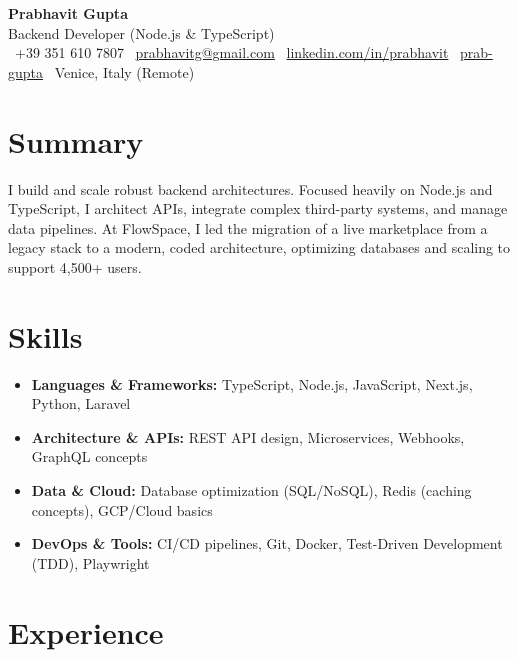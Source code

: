 \documentclass[a4paper,10pt]{article}
\begin{document}
\begin{center}
 {\Huge\bfseries Prabhavit Gupta}\\[3pt]
 {\color{accent}\large Backend Developer (Node.js \& TypeScript)}\\[5pt]
 \faPhone\ +39 351 610 7807 \quad
 \faEnvelope\ \href{mailto:prabhavitg@gmail.com}{prabhavitg@gmail.com} \quad
 \faLinkedin\ \href{https://www.linkedin.com/in/prabhavit/}{linkedin.com/in/prabhavit} \quad
 \faGithub\ \href{https://github.com/prab-gupta}{prab-gupta} \quad
 \faMapMarker*\ Venice, Italy (Remote)
\end{center}

\section{Summary}
I build and scale robust backend architectures. Focused heavily on Node.js and TypeScript, I architect APIs, integrate complex third-party systems, and manage data pipelines. At FlowSpace, I led the migration of a live marketplace from a legacy stack to a modern, coded architecture, optimizing databases and scaling to support 4,500+ users.

\section{Skills}
\begin{itemize}
 \item \textbf{Languages \& Frameworks:} TypeScript, Node.js, JavaScript, Next.js, Python, Laravel
 \item \textbf{Architecture \& APIs:} REST API design, Microservices, Webhooks, GraphQL concepts
 \item \textbf{Data \& Cloud:} Database optimization (SQL/NoSQL), Redis (caching concepts), GCP/Cloud basics
 \item \textbf{DevOps \& Tools:} CI/CD pipelines, Git, Docker, Test-Driven Development (TDD), Playwright
\end{itemize}

\section{Experience}
\end{document}

